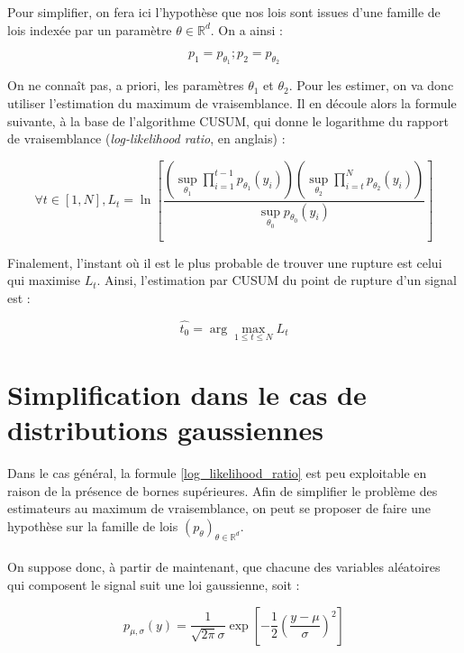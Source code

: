 \documentclass[french,12pt,notitlepage]{report}
\begin{document}
	Pour simplifier, on fera ici l'hypothèse que nos lois sont issues d'une famille de lois indexée par un paramètre $\theta \in \mathbb{R}^d$. On a ainsi :

	\begin{equation*}
		p_1 = p_{\theta_1} ; p_2 = p_{\theta_2}
	\end{equation*}

	On ne connaît pas, a priori, les paramètres $\theta_1$ et $\theta_2$. Pour les estimer, on va donc utiliser l'estimation du maximum de vraisemblance. Il en découle alors la formule suivante, à la base de l'algorithme CUSUM, qui donne le logarithme du rapport de vraisemblance (\textit{log-likelihood ratio}, en anglais) :

	\begin{equation}
		\forall t \in [1, N], L_t=\ln\left[\frac{\left(\sup_{\theta_1}\prod_{i=1}^{t-1}p_{\theta_1}(y_i)\right)\left(\sup_{\theta_2}\prod_{i=t}^Np_{\theta_2}(y_i)\right)}{\sup_{\theta_0}p_{\theta_0}(y_i)}\right]
		\label{log_likelihood_ratio}
	\end{equation}

	Finalement, l'instant où il est le plus probable de trouver une rupture est celui qui maximise $L_t$. Ainsi, l'estimation par CUSUM du point de rupture d'un signal est :

	\begin{equation}
		\hat{t_0}=\arg\max_{1\le t\le N}L_t
	\end{equation}

	\section{Simplification dans le cas de distributions gaussiennes}
	Dans le cas général, la formule \ref{log_likelihood_ratio} est peu exploitable en raison de la présence de bornes supérieures. Afin de simplifier le problème des estimateurs au maximum de vraisemblance, on peut se proposer de faire une hypothèse sur la famille de lois $(p_\theta)_{\theta \in \mathbb{R}^d}$.
	\\ \\
	On suppose donc, à partir de maintenant, que chacune des variables aléatoires qui composent le signal suit une loi gaussienne, soit :

	\begin{equation*}
		p_{\mu, \sigma}(y) = \frac1{\sqrt{2 \pi} \sigma} \exp \left[ -\frac12 \left( \frac{y - \mu}{\sigma} \right)^2 \right]
	\end{equation*}
\end{document}
